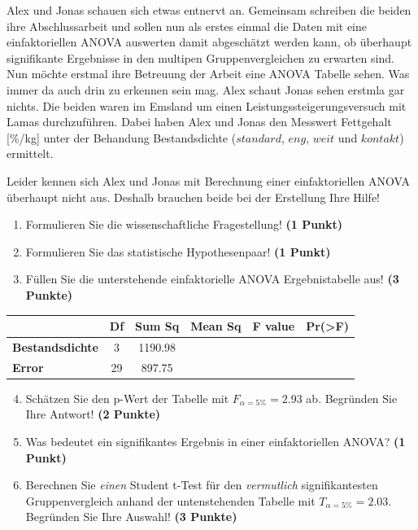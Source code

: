 \documentclass[a4paper, 9pt]{scrartcl}\usepackage[]{graphicx}\usepackage[]{xcolor}
\begin{document}
Alex und Jonas schauen sich etwas entnervt an. Gemeinsam schreiben die beiden ihre Abschlussarbeit und sollen nun als erstes einmal die Daten mit eine einfaktoriellen ANOVA auswerten damit abgeschätzt werden kann, ob überhaupt signifikante Ergebnisse in den multipen Gruppenvergleichen zu erwarten sind. Nun möchte erstmal ihre Betreuung der Arbeit eine ANOVA Tabelle sehen. Was immer da auch drin zu erkennen sein mag. Alex schaut Jonas sehen erstmla gar nichts. Die beiden waren im Emsland um einen Leistungssteigerungsversuch mit Lamas durchzuführen. Dabei haben Alex und Jonas den Messwert Fettgehalt [\%/kg] unter der Behandung Bestandsdichte ($standard$, $eng$, $weit$ und $kontakt$) ermittelt.



\vspace{1ex}

Leider kennen sich Alex und Jonas mit Berechnung einer einfaktoriellen ANOVA überhaupt nicht aus. Deshalb brauchen beide bei der Erstellung Ihre Hilfe! 

\begin{enumerate}
  \item Formulieren Sie die wissenschaftliche Fragestellung! \textbf{(1 Punkt)}
  \item Formulieren Sie das statistische Hypothesenpaar! \textbf{(1 Punkt)}
\item Füllen Sie die unterstehende einfaktorielle ANOVA Ergebnistabelle aus! \textbf{(3 Punkte)}
\end{enumerate}

\vspace{1Ex}

\begin{center}
  \Large
  \begin{tabular}{lccccp{3cm}}
\toprule
     & \textbf{Df} & \textbf{Sum Sq} & \textbf{Mean Sq} & \textbf{F value} & \textbf{Pr(>F)} \strut\\
    \midrule
   \textbf{Bestandsdichte}  & 3 & 1190.98 &  &  &  \strut\\
   \textbf{Error}  & 29 & 897.75 &  &  &  \strut\\
\bottomrule
  \end{tabular}
\end{center}

\vspace{1Ex}

\begin{enumerate}
  \setcounter{enumi}{3}
\item Schätzen Sie den p-Wert der Tabelle mit $F_{\alpha = 5\%} = 2.93$ ab. Begründen Sie Ihre Antwort! \textbf{(2 Punkte)}
\item Was bedeutet ein signifikantes Ergebnis in einer einfaktoriellen ANOVA? \textbf{(1 Punkt)}
\item Berechnen Sie \textit{einen} Student t-Test für den \textit{vermutlich} signifikantesten Gruppenvergleich anhand der untenstehenden Tabelle mit $T_{\alpha = 5\%} = 2.03$. Begründen Sie Ihre Auswahl! \textbf{(3 Punkte)}
\end{enumerate}
\end{document}
